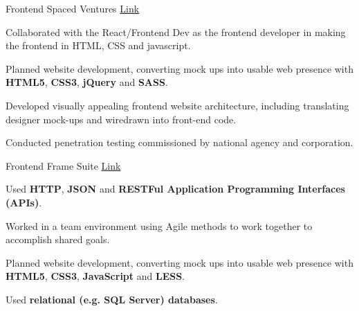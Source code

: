 

\begin{cventries}

  \cventry
    {Frontend} %
    {Spaced Ventures} %
    {{\href{https://www.spacedventures.com/}{Link}}} %
    {} %
    {
      \begin{cvitems} %
        \item {Collaborated with the React/Frontend Dev as the frontend developer in making the frontend in HTML, CSS and javascript.}
        \item {Planned website development, converting mock ups into usable web presence with \textbf{HTML5}, \textbf{CSS3}, \textbf{jQuery} and \textbf{SASS}.}
        \item {Developed visually appealing frontend website architecture, including translating designer mock-ups and wiredrawn into front-end code.}
        \item {Conducted penetration testing commissioned by national agency and corporation.}
      \end{cvitems}
    }

  \cventry
    {Frontend} %
    {Frame Suite} %
    {{\href{https://store.framesuite.com/}{Link}}} %
    {} %
    {
      \begin{cvitems} %
        \item {Used \textbf{HTTP}, \textbf{JSON} and \textbf{RESTFul Application Programming Interfaces (APIs)}.}
        \item {Worked in a team environment using Agile methods to work together to accomplish shared goals.}
        \item {Planned website development, converting mock ups into usable web presence with \textbf{HTML5}, \textbf{CSS3}, \textbf{JavaScript} and \textbf{LESS}.}
        \item {Used \textbf{relational (e.g. SQL Server) databases}.}
      \end{cvitems}
    }

\end{cventries}
